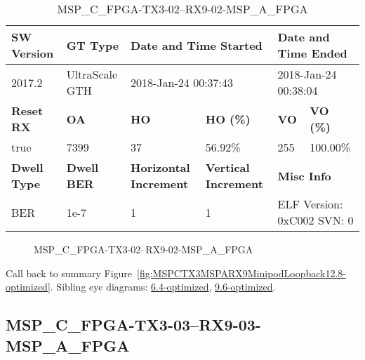 \begin{table}[h]
\centering
\caption{MSP\_C\_FPGA-TX3-02--RX9-02-MSP\_A\_FPGA}
\label{tab:MSPCFPGATX302RX902MSPAFPGA12.8-optimized}
\begin{tabular}{@{}|l|l|l|l|l|l|@{}}
\toprule
\textbf{SW Version}                & \textbf{GT Type}   & \multicolumn{2}{l|}{\textbf{Date and Time Started}}            & \multicolumn{2}{l|}{\textbf{Date and Time Ended}}        \\ \midrule
2017.2                       & UltraScale GTH          & \multicolumn{2}{l|}{2018-Jan-24 00:37:43}                   & \multicolumn{2}{l|}{2018-Jan-24 00:38:04}               \\ \midrule
\textbf{Reset RX}                  & \textbf{OA} & \textbf{HO}   & \textbf{HO (\%)} & \textbf{VO} & \textbf{VO (\%)} \\ \midrule
true & 7399        & 37          & 56.92\%        & 255        & 100.00\%       \\ \midrule
\textbf{Dwell Type}                & \textbf{Dwell BER} & \textbf{Horizontal Increment} & \textbf{Vertical Increment}    & \multicolumn{2}{l|}{\textbf{Misc Info}}                  \\ \midrule
BER                            & 1e-7        & 1        & 1           & \multicolumn{2}{l|}{ELF Version: 0xC002 SVN: 0}                         \\ \bottomrule
\end{tabular}
\end{table}

\begin{figure}[h]
\caption{MSP\_C\_FPGA-TX3-02--RX9-02-MSP\_A\_FPGA} \label{fig:MSPCFPGATX302RX902MSPAFPGA12.8-optimized}
\end{figure}

Call back to summary Figure~\ref{fig:MSPCTX3MSPARX9MinipodLoopback12.8-optimized}.
Sibling eye diagrams: \hyperref[sec:MSPCFPGATX302RX902MSPAFPGA6.4-optimized]{6.4-optimized}, \hyperref[sec:MSPCFPGATX302RX902MSPAFPGA9.6-optimized]{9.6-optimized}.

\clearpage
\newpage


\subsection{MSP\_C\_FPGA-TX3-03--RX9-03-MSP\_A\_FPGA}\label{sec:MSPCFPGATX303RX903MSPAFPGA12.8-optimized}


